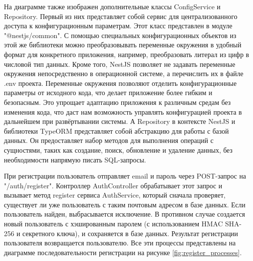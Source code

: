	На диаграмме также изображен дополнительные классы ConfigService и Repository. Первый из них представляет собой сервис для централизованного доступа к конфигурационным параметрам. Этот класс представлен в модуле "@nestjs/common". С помощью специальных конфигурационных объектов из этой же библиотеки можно преобразовывать переменные окружения в удобный формат для конкретного приложения, например, преобразовать литерал из цифр в числовой тип данных. Кроме того, NestJS позволяет не задавать переменные окружения непосредственно в операционной системе, а перечислить их в файле .env проекта. Переменные окружения позволяют отделить конфигурационные параметры от исходного кода, что делает приложение более гибким и безопасным. Это упрощает адаптацию приложения к различным средам без изменения кода, что даст нам возможность управлять конфигурацией проекта в дальнейшем при развёртывании системы. А Repository в контексте NestJS и библиотеки TypeORM представляет собой абстракцию для работы с базой данных. Он предоставляет набор методов для выполнения операций с сущностями, таких как создание, поиск, обновление и удаление данных, без необходимости напрямую писать SQL-запросы.

	При регистрации пользователь отправляет email и пароль через POST-запрос на "/auth/register". Контроллер AuthController обрабатывает этот запрос и вызывает метод register сервиса AuthService, который сначала проверяет, существует ли уже пользователь с таким почтовым адресом в базе данных. Если пользователь найден, выбрасывается исключение. В противном случае создается новый пользователь с хэшированным паролем (с использованием HMAC SHA-256 и секретного ключа), и сохраняется в базе данных. Результат регистрации пользователя возвращается пользователю. Все эти процессы представлены на диаграмме последовательности регистрации на рисунке \ref{fig:register_processes}.

